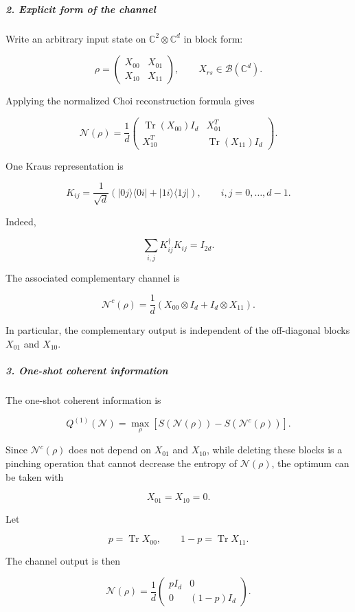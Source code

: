 \subparagraph*{2. Explicit form of the channel}

Write an arbitrary input state on $\mathbb C^2\otimes\mathbb C^d$ in block form:

\[
\rho=
\begin{pmatrix}
X_{00}&X_{01}\\
X_{10}&X_{11}
\end{pmatrix},
\qquad
X_{rs}\in\mathcal B(\mathbb C^d).
\]

Applying the normalized Choi reconstruction formula gives

\[
{
\mathcal N(\rho)
=
\frac{1}{d}
\begin{pmatrix}
\operatorname{Tr}(X_{00})I_d&X_{01}^{T}\\
X_{10}^{T}&\operatorname{Tr}(X_{11})I_d
\end{pmatrix}.
}
\]

One Kraus representation is

\[
K_{ij} = \frac{1}{\sqrt d} \left( |0j\rangle\langle0i| + |1i\rangle\langle1j| \right), \qquad i,j=0,\ldots,d-1.
\]

Indeed,

\[
\sum_{i,j}K_{ij}^{\dagger}K_{ij} = I_{2d}.
\]

The associated complementary channel is

\[
{ \mathcal N^c(\rho) = \frac{1}{d} \left( X_{00}\otimes I_d + I_d\otimes X_{11} \right). }
\]

In particular, the complementary output is independent of the off-diagonal blocks $X_{01}$ and $X_{10}$.

\subparagraph*{3. One-shot coherent information}

The one-shot coherent information is

\[
Q^{(1)}(\mathcal N) = \max_{\rho} \left[ S(\mathcal N(\rho))-S(\mathcal N^c(\rho)) \right].
\]

Since $\mathcal N^c(\rho)$ does not depend on $X_{01}$ and $X_{10}$, while deleting these blocks is a pinching operation that cannot decrease the entropy of $\mathcal N(\rho)$, the optimum can be taken with

\[
X_{01}=X_{10}=0.
\]

Let

\[
p=\operatorname{Tr}X_{00}, \qquad 1-p=\operatorname{Tr}X_{11}.
\]

The channel output is then

\[
\mathcal N(\rho)
=
\frac{1}{d}
\begin{pmatrix}
pI_d&0\\
0&(1-p)I_d
\end{pmatrix}.
\]

